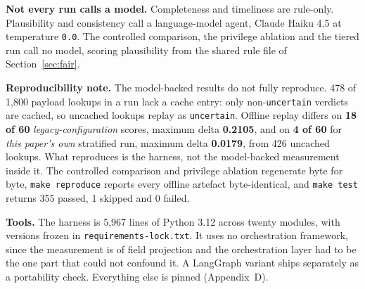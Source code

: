 \label{sec:reprodetail}

\textbf{Not every run calls a model.} Completeness and timeliness are rule-only. Plausibility and
consistency call a language-model agent, Claude Haiku 4.5 at temperature \texttt{0.0}. The controlled
comparison, the privilege ablation and the tiered run call no model, scoring plausibility from the
shared rule file of Section~\ref{sec:fair}.

\textbf{Reproducibility note.} The model-backed results do not fully reproduce. 478 of 1{,}800
payload lookups in a run lack
a cache entry: only non-\texttt{uncertain} verdicts are cached, so uncached lookups replay as
\texttt{uncertain}. Offline replay differs on \textbf{18 of 60}
\emph{legacy-configuration} scores, maximum delta \textbf{0.2105}, and on \textbf{4 of 60} for
\emph{this paper's own} stratified run, maximum delta \textbf{0.0179}, from 426 uncached lookups.
What reproduces is the harness, not the model-backed measurement inside it. The controlled comparison
and privilege ablation regenerate byte for byte, \texttt{make reproduce} reports every offline
artefact byte-identical, and \texttt{make test} returns 355 passed, 1 skipped and 0 failed.

\textbf{Tools.} The harness is 5{,}967 lines of Python 3.12 across twenty modules, with versions
frozen in \texttt{requirements-lock.txt}. It uses no orchestration framework, since the measurement
is of field projection and the orchestration layer had to be the one part that could not confound it.
A LangGraph variant ships separately as a portability check. Everything else is pinned (Appendix~D).
